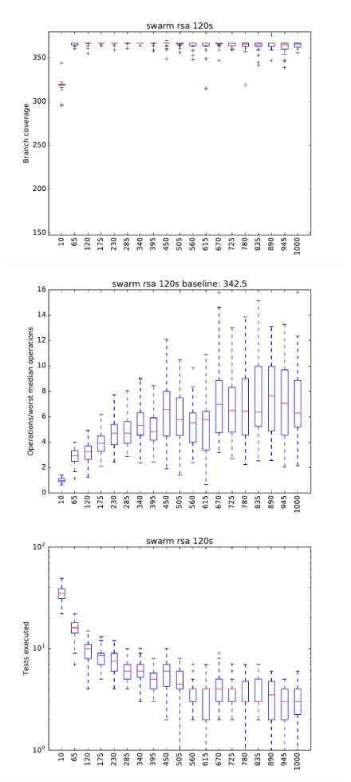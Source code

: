 \begin{figure}
\includegraphics[width=\columnwidth]{graphs/rsaswarm120}
\includegraphics[width=\columnwidth]{graphs/opsrsaswarm120}
\includegraphics[width=\columnwidth]{graphs/execrsaswarm120}
\end{figure}


